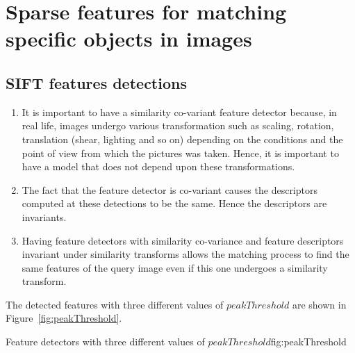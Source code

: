 \documentclass{article}
\begin{document}
\maketitle

\section{Sparse features for matching specific objects in images}
\subsection{SIFT features detections}

\begin{enumerate}
\item It is important to have a similarity co-variant feature detector because, in real life, images undergo various transformation such as scaling, rotation, translation (shear, lighting and so on) depending on the conditions and the point of view from which the pictures was taken. Hence, it is important to have a model that does not depend upon these transformations.
\item The fact that the feature detector is co-variant causes the descriptors computed at these detections to be the same. Hence the descriptors are invariants.
\item Having feature detectors with similarity co-variance and feature descriptors invariant under similarity transforms allows the matching process to find the same features of the query image even if this one undergoes a similarity transform.
\end{enumerate}


The detected features with three different values of $peakThreshold$ are shown in Figure~\ref{fig:peakThreshold}. %

          {}
          {}
          {Feature detectors with three different values of $peakThreshold$}{fig:peakThreshold}
					
\end{document}
